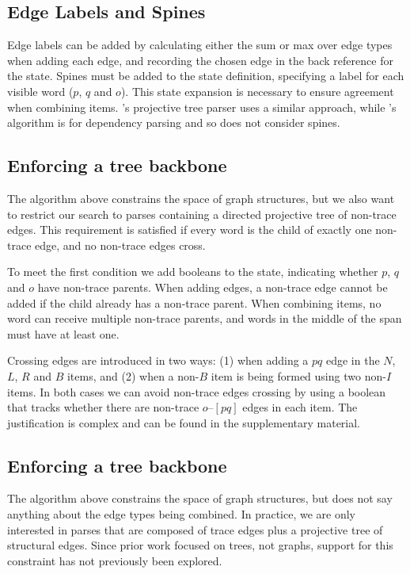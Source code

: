 \subsection{Edge Labels and Spines}\label{sec:labels}
Edge labels can be added by calculating either the sum or max over edge types when adding each edge, and recording the chosen edge in the back reference for the state.
Spines must be added to the state definition, specifying a label for each visible word ($p$, $q$ and $o$).
This state expansion is necessary to ensure agreement when combining items.
\textcite{cck}'s projective tree parser uses a similar approach, while \textcite{ec}'s algorithm is for dependency parsing and so does not consider spines.

\subsection{Enforcing a tree backbone}
The algorithm above constrains the space of graph structures, but we also want to restrict our search to parses containing a directed projective tree of non-trace edges.
This requirement is satisfied if every word is the child of exactly one non-trace edge, and no non-trace edges cross.

To meet the first condition we add booleans to the state, indicating whether $p$, $q$ and $o$ have non-trace parents.
When adding edges, a non-trace edge cannot be added if the child already has a non-trace parent.
When combining items, no word can receive multiple non-trace parents, and words in the middle of the span must have at least one.

Crossing edges are introduced in two ways:
(1) when adding a $pq$ edge in the $N$, $L$, $R$ and $B$ items, and
(2) when a non-$B$ item is being formed using two non-$I$ items.
In both cases we can avoid non-trace edges crossing by using a boolean that tracks whether there are non-trace $o$--$[pq]$ edges in each item.
The justification is complex and can be found in the supplementary material.

\subsection{Enforcing a tree backbone}
The algorithm above constrains the space of graph structures, but does not say anything about the edge types being combined.
In practice, we are only interested in parses that are composed of trace edges plus a projective tree of structural edges.
Since prior work focused on trees, not graphs, support for this constraint has not previously been explored.

